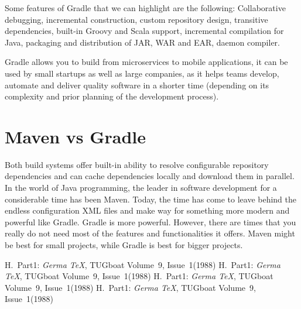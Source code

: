\documentclass[a4paper,11pt]{article}
\begin{document}
Some features of Gradle that we can highlight are the following: Collaborative debugging,
incremental construction, custom repository design, transitive dependencies, built-in Groovy
and Scala support, incremental compilation for Java, packaging and distribution of JAR,
WAR and EAR, daemon compiler.

Gradle allows you to build from microservices to mobile applications, it can be used by small
startups as well as large companies, as it helps teams develop, automate and deliver quality
software in a shorter time (depending on its complexity and prior planning of the development
process)\cite{Gradle}.

\section{Maven vs Gradle}
Both build systems offer built-in ability to resolve configurable repository dependencies and
can cache dependencies locally and download them in parallel. In the world of Java programming,
the leader in software development for a considerable time has been Maven. Today, the time has
come to leave behind the endless configuration XML files and make way for something more modern
and powerful like Gradle. Gradle is more powerful. However, there are times that you really do
not need most of the features and functionalities it offers. Maven might be best for small
projects, while Gradle is best for bigger projects\cite{DZone}.

\begin{thebibliography}{99}
     H.~Part1: \emph{Germa \TeX}, TUGboat Volume~9, Issue~1(1988) 
     H.~Part1: \emph{Germa \TeX}, TUGboat Volume~9, Issue~1(1988) 
     H.~Part1: \emph{Germa \TeX}, TUGboat Volume~9, Issue~1(1988) 
     H.~Part1: \emph{Germa \TeX}, TUGboat Volume~9, Issue~1(1988) 
\end{thebibliography}
\end{document}
